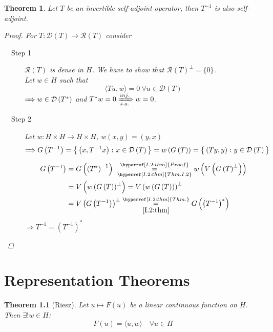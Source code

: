 \documentclass[12pt]{extreport} %
\newcommand{\DO}[1]{\mathcal{D}\left( {#1} \right)}
\newcommand{\RO}[1]{\mathcal{R}\left( {#1} \right)}
\theoremstyle{named}
\theoremstyle{nnamed}
\theoremstyle{itshape}
\newtheorem{theorem}{Theorem}  \counterwithin{theorem}{chapter}
\theoremstyle{normal}
\begin{document}
\begin{theorem}
	Let $T$ be an invertible self-adjoint operator, then $T^{-1}$ is also self-adjoint.
	
	\begin{proof}
		For $T \colon \DO{T} \rightarrow \RO{T}$ consider
		\begin{description}
			\item[~\hspace{0.25em}~Step 1] $\RO{T}$ is dense in $H$. We have to show that $\RO{T}^\perp = \{ 0 \}$. ~\\
				Let $w \in H$ such that 
					$$\langle T u, w \rangle = 0 ~\forall u \in \DO{T}$$
				$\RightArrow w \in \DO{T^*}$ and $T^* w = 0 \xRightarrow[s.a.]{inj.} w = 0$.
			\item[~\hspace{0.25em}~Step 2] Let $w \colon H \times H \rightarrow H \times H$, $w(x,y) = (y, x)$
			$$ \RightArrow G\left( T^{-1} \right) = \big\{ \left(x, T^{-1} x\right) \colon x \in \DO{T} \big\} = w\left(G\left(T\right)\right) = \big\{ \left(Ty, y\right) \colon y \in \DO{T} \big\} $$
			\begin{align*}
				G\left( T^{-1} \right) & = G \left( \left( T^* \right)^{-1} \right) ~\overset{\hyperref[I.2:thm]{Proof}}{\underset{\hyperref[I.2:thm]{Thm. I.2}}{=}} w \left( V \left( G \left(T \right)^{\perp} \right) \right) \\
				& = V \left( w \left( G \left( T \right) \right)^{\perp} \right) =  V \left( w \left( G \left( T \right) \right) \right)^{\perp} \\
				& =  V \left(  G \left( T^{-1} \right) \right)^{\perp} \overset{\hyperref[I.2:thm]{Thm.}}{\underset{\ref{I.2:thm}}{=}} G \left( \left( T^{-1} \right)^* \right)
			\end{align*}
			$\Rightarrow T^{-1} = \left( T^{-1} \right)^*$
		\end{description}
	\end{proof}
\end{theorem}


\chapter{Representation Theorems}

\begin{theorem}[Riesz]
	Let $u \mapsto F(u)$ be a linear continuous function on $H$. Then $\exists! w \in H$:
	$$ F(u) = \langle u, w \rangle \quad \forall u \in H $$
\end{theorem}
\end{document}
